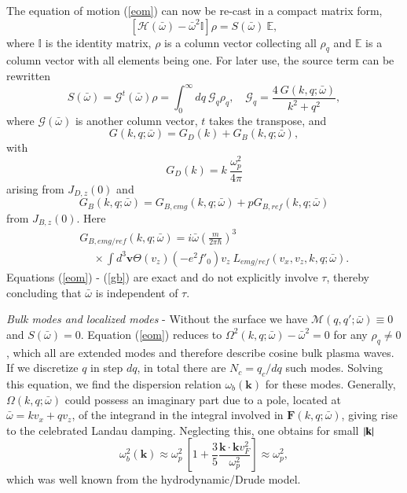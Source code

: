 \documentclass[aps,reprint]{revtex4-1}
\begin{document}
The equation of motion (\ref{eom}) can now be re-cast in a compact matrix form,
\begin{equation}
\left[\mathcal{H}(\bar{\omega}) - \bar{\omega}^2\mathbb{I}\right] \rho = S(\bar{\omega})~\mathbb{E}, \label{eomb}
\end{equation}
where $\mathbb{I}$ is the identity matrix, $\rho$ is a column vector collecting all $\rho_q$ and $\mathbb{E}$ is a column vector with all elements being one. For later use, the source term can be rewritten 
\begin{equation}
S(\bar{\omega}) = \mathcal{G}^{t}(\bar{\omega})\rho = \int^{\infty}_0 dq~\mathcal{G}_q\rho_q, \quad \mathcal{G}_q = \frac{4~G(k,q;\bar{\omega})}{k^2+q^2}, \label{s}
\end{equation}
where $\mathcal{G}(\bar{\omega})$ is another column vector, $t$ takes the transpose, and $$G(k,q;\bar{\omega}) = G_D(k)+G_B(k,q;\bar{\omega}),$$ with $$G_D(k) = k ~ \frac{\omega^2_p}{4\pi}$$ arising from $J_{D,z}(0)$ and $$G_B(k,q;\bar{\omega}) = G_{B,emg}(k,q;\bar{\omega}) + pG_{B,ref}(k,q;\bar{\omega})$$ from $J_{B,z}(0)$. Here 
\begin{eqnarray}
&~&G_{B,emg/ref}(k,q;\bar{\omega}) = i\bar{\omega}\left(\frac{m}{2\pi\hbar}\right)^3 \nonumber \\ &~& ~\quad \times  \int d^3\mathbf{v} \Theta(v_z)(-e^2f'_0)v_z~L_{emg/ref}(v_x,v_z,k,q;\bar{\omega}). \label{gb}
\end{eqnarray}
Equations (\ref{eom}) - (\ref{gb}) are exact and do not explicitly involve $\tau$, thereby concluding that $\bar{\omega}$ is independent of $\tau$. 

\textit{Bulk modes and localized modes} - Without the surface we have $\mathcal{M}(q,q';\bar{\omega})\equiv 0$ and $S(\bar{\omega}) = 0$. Equation (\ref{eom}) reduces to $\Omega^2(k,q;\bar{\omega}) - \bar{\omega}^2 = 0$ for any $\rho_q\neq 0$, which all are extended modes and therefore describe cosine bulk plasma waves. If we discretize $q$ in step $dq$, in total there are $N_c = q_c/dq$ such modes. Solving this equation, we find the dispersion relation $\omega_b(\mathbf{k})$ for these modes. Generally, $\Omega(k,q;\bar{\omega})$ could possess an imaginary part due to a pole, located at $\bar{\omega}=kv_x+qv_z$, of the integrand in the integral involved in $\mathbf{F}(k,q;\bar{\omega})$, giving rise to the celebrated Landau damping. Neglecting this, one obtains for small $~\abs{\mathbf{k}}$
\begin{equation}
\omega^2_b(\mathbf{k}) \approx \omega^2_p ~\left[1+\frac{3}{5}\frac{\mathbf{k}\cdot\mathbf{k}v^2_F}{\omega^2_p}\right] \approx \omega^2_p, \label{hydro}
\end{equation}
which was well known from the hydrodynamic/Drude model. 
\end{document}
